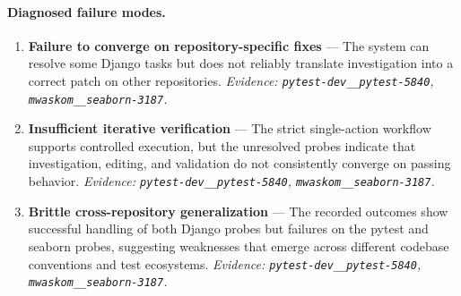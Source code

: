 \paragraph{Diagnosed failure modes.}\begin{enumerate}\itemsep1pt
\item \textbf{Failure to converge on repository-specific fixes} --- The system can resolve some Django tasks but does not reliably translate investigation into a correct patch on other repositories. \emph{Evidence: \texttt{pytest-dev\_\_pytest-5840}, \texttt{mwaskom\_\_seaborn-3187}.}
\item \textbf{Insufficient iterative verification} --- The strict single-action workflow supports controlled execution, but the unresolved probes indicate that investigation, editing, and validation do not consistently converge on passing behavior. \emph{Evidence: \texttt{pytest-dev\_\_pytest-5840}, \texttt{mwaskom\_\_seaborn-3187}.}
\item \textbf{Brittle cross-repository generalization} --- The recorded outcomes show successful handling of both Django probes but failures on the pytest and seaborn probes, suggesting weaknesses that emerge across different codebase conventions and test ecosystems. \emph{Evidence: \texttt{pytest-dev\_\_pytest-5840}, \texttt{mwaskom\_\_seaborn-3187}.}
\end{enumerate}

